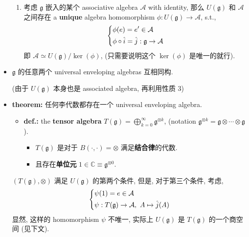 \begin{itemize}
\begin{enumerate}
		\item 考虑 $\mathfrak{g}$ 嵌入的某个 associative algebra $\mathcal{A}$ with identity, 那么 $U(\mathfrak{g})$ 和 $\mathcal{A}$ 之间存在 a \textbf{unique} algebra homomorphism $\phi : U(\mathfrak{g}) \rightarrow \mathcal{A}$, s.t.,
		\begin{equation}
			\begin{dcases}
				\phi(e) = e' \in \mathcal{A} \\
				\phi \circ \hat{i} = \hat{j} : \mathfrak{g} \rightarrow \mathcal{A}
			\end{dcases}
		\end{equation}
		即 $\mathcal{A} \simeq U(\mathfrak{g}) / \ker(\phi)$, (只需要说明这个 $\ker(\phi)$ 是唯一的就行).
	\end{enumerate}
	
	\item $\mathfrak{g}$ 的任意两个 universal enveloping algebras 互相同构.
	
	(由于 $U(\mathfrak{g})$ 本身也是 associated algebra, 再利用性质 3)
	
	\item \textbf{theorem:} 任何李代数都存在一个 universal enveloping algebra.
	
	\begin{tcolorbox}[title=proof:]
		\begin{itemize}
			\item \textbf{def.:} the \textbf{tensor algebra} $T(\mathfrak{g}) = \bigoplus_{k = 0}^\infty \mathfrak{g}^{\otimes k}$, (notation $\mathfrak{g}^{\otimes k} = \mathfrak{g} \otimes \cdots \otimes \mathfrak{g}$).
			\begin{itemize}
				\item $T(\mathfrak{g})$ 是对于 $B(\cdot, \cdot) = \otimes$ 满足\textbf{结合律}的代数.
				
				\item 且存在\textbf{单位元} $1 \in \mathbb{C} \equiv \mathfrak{g}^{\otimes 0}$.
			\end{itemize}
		\end{itemize}
		
		$(T(\mathfrak{g}), \otimes)$ 满足 $U(\mathfrak{g})$ 的第两个条件, 但是, 对于第三个条件, 考虑,
		\begin{equation}
			\begin{dcases}
				\psi(1) = e \in \mathcal{A} \\
				\psi : T(\mathfrak{g}) \rightarrow \mathcal{A}, \ A \mapsto \hat{j}(A)
			\end{dcases}
		\end{equation}
		显然, 这样的 homomorphism $\psi$ 不唯一, 实际上 $U(\mathfrak{g})$ 是 $T(\mathfrak{g})$ 的一个商空间 (见下文).
		

\end{tcolorbox}
\end{itemize}
